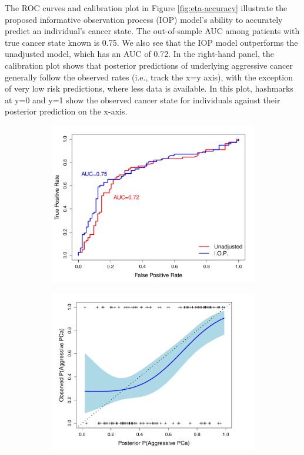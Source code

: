 \documentclass[12pt, letterpaper]{article}
\begin{document}
The ROC curves and calibration plot in Figure \ref{fig:eta-accuracy} illustrate the proposed informative observation process (IOP) model's ability to accurately predict an individual's cancer state. The out-of-sample AUC among patients with true cancer state known is 0.75.  We also see that the IOP model outperforms the unadjusted model, which has an AUC of 0.72. In the right-hand panel, the calibration plot shows that posterior predictions of underlying aggressive cancer generally follow the observed rates (i.e., track the x=y axis), with the exception of very low risk predictions, where less data is available. In this plot, hashmarks at y=0 and y=1 show the observed cancer state for individuals against their posterior prediction on the x-axis. 
\begin{figure}
\begin{center}
\begin{subfigure}[b]{0.45\textwidth}
\includegraphics[width=\textwidth]{pred-vs-obs-eta-roc}
\label{fig:roc}
\end{subfigure}
\begin{subfigure}[b]{0.45\textwidth}
\includegraphics[width=\textwidth]{pred-vs-obs-eta}

\end{subfigure}
\end{center}
\end{figure}
\end{document}
